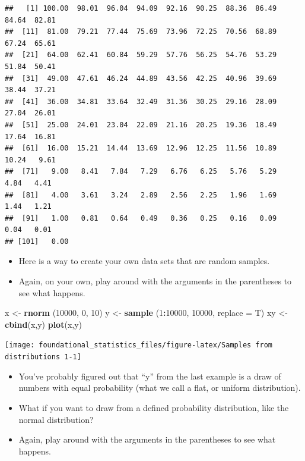 \documentclass[]{book}
\newenvironment{Shaded}{\begin{snugshade}}{\end{snugshade}}
\newcommand{\DataTypeTok}[1]{\textcolor[rgb]{0.13,0.29,0.53}{#1}}
\newcommand{\DecValTok}[1]{\textcolor[rgb]{0.00,0.00,0.81}{#1}}
\newcommand{\KeywordTok}[1]{\textcolor[rgb]{0.13,0.29,0.53}{\textbf{#1}}}
\newcommand{\NormalTok}[1]{#1}
\newcommand{\OperatorTok}[1]{\textcolor[rgb]{0.81,0.36,0.00}{\textbf{#1}}}
\newcommand{\StringTok}[1]{\textcolor[rgb]{0.31,0.60,0.02}{#1}}
\begin{document}
\begin{verbatim}
##   [1] 100.00  98.01  96.04  94.09  92.16  90.25  88.36  86.49  84.64  82.81
##  [11]  81.00  79.21  77.44  75.69  73.96  72.25  70.56  68.89  67.24  65.61
##  [21]  64.00  62.41  60.84  59.29  57.76  56.25  54.76  53.29  51.84  50.41
##  [31]  49.00  47.61  46.24  44.89  43.56  42.25  40.96  39.69  38.44  37.21
##  [41]  36.00  34.81  33.64  32.49  31.36  30.25  29.16  28.09  27.04  26.01
##  [51]  25.00  24.01  23.04  22.09  21.16  20.25  19.36  18.49  17.64  16.81
##  [61]  16.00  15.21  14.44  13.69  12.96  12.25  11.56  10.89  10.24   9.61
##  [71]   9.00   8.41   7.84   7.29   6.76   6.25   5.76   5.29   4.84   4.41
##  [81]   4.00   3.61   3.24   2.89   2.56   2.25   1.96   1.69   1.44   1.21
##  [91]   1.00   0.81   0.64   0.49   0.36   0.25   0.16   0.09   0.04   0.01
## [101]   0.00
\end{verbatim}

\begin{itemize}
\item
  Here is a way to create your own data sets that are random samples.
\item
  Again, on your own, play around with the arguments in the parentheses to see what happens.
\end{itemize}

\begin{Shaded}
\begin{Highlighting}[]
\NormalTok{x <-}\StringTok{ }\KeywordTok{rnorm}\NormalTok{ (}\DecValTok{10000}\NormalTok{, }\DecValTok{0}\NormalTok{, }\DecValTok{10}\NormalTok{)}
\NormalTok{y <-}\StringTok{ }\KeywordTok{sample}\NormalTok{ (}\DecValTok{1}\OperatorTok{:}\DecValTok{10000}\NormalTok{, }\DecValTok{10000}\NormalTok{, }\DataTypeTok{replace =}\NormalTok{ T)}
\NormalTok{xy <-}\StringTok{ }\KeywordTok{cbind}\NormalTok{(x,y)}
\KeywordTok{plot}\NormalTok{(x,y) }
\end{Highlighting}
\end{Shaded}

\texttt{[image: foundational\_statistics\_files/figure-latex/Samples from distributions 1-1]}

\begin{itemize}
\item
  You've probably figured out that ``y'' from the last example is a draw of numbers with equal probability (what we call a flat, or uniform distribution).
\item
  What if you want to draw from a defined probability distribution, like the normal distribution?
\item
  Again, play around with the arguments in the parentheses to see what happens.
\end{itemize}
\end{document}
